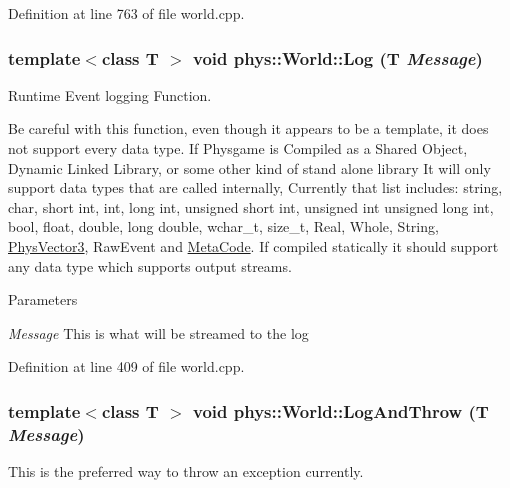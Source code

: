 Definition at line 763 of file world.cpp.

\hypertarget{classphys_1_1World_a05267a20e8d5518771d0848190b33d60}{
\subsubsection[{Log}]{\setlength{\rightskip}{0pt plus 5cm}template$<$class T $>$ void phys::World::Log (T {\em Message})}}
\label{da/ddf/classphys_1_1World_a05267a20e8d5518771d0848190b33d60}


Runtime Event logging Function. 

Be careful with this function, even though it appears to be a template, it does not support every data type. If Physgame is Compiled as a Shared Object, Dynamic Linked Library, or some other kind of stand alone library It will only support data types that are called internally, Currently that list includes: string, char, short int, int, long int, unsigned short int, unsigned int unsigned long int, bool, float, double, long double, wchar\_\-t, size\_\-t, Real, Whole, String, \hyperlink{classPhysVector3}{PhysVector3}, RawEvent and \hyperlink{classphys_1_1MetaCode}{MetaCode}. If compiled statically it should support any data type which supports output streams. 
\begin{DoxyParams}{Parameters}
\item[{\em Message}]This is what will be streamed to the log \end{DoxyParams}


Definition at line 409 of file world.cpp.

\hypertarget{classphys_1_1World_a88e6bdee6b972111b6804ca746738c50}{
\subsubsection[{LogAndThrow}]{\setlength{\rightskip}{0pt plus 5cm}template$<$class T $>$ void phys::World::LogAndThrow (T {\em Message})}}
\label{da/ddf/classphys_1_1World_a88e6bdee6b972111b6804ca746738c50}


This is the preferred way to throw an exception currently. 

